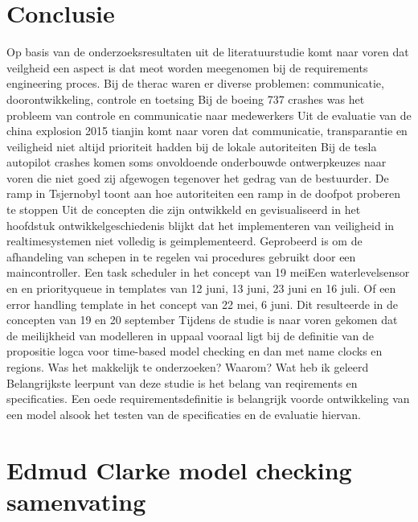 \documentclass{article}
\begin{document}
	\section{Conclusie}
	
	
	
	Op basis van de onderzoeksresultaten uit de literatuurstudie komt naar voren dat veilgheid een aspect is dat meot worden meegenomen bij de requirements engineering proces.
	Bij de therac waren er diverse problemen: communicatie, doorontwikkeling, controle en toetsing
	Bij de boeing 737 crashes was het probleem van controle en communicatie naar medewerkers
	Uit de evaluatie van de china explosion 2015 tianjin komt naar voren dat communicatie, transparantie en veiligheid niet altijd prioriteit hadden bij de lokale autoriteiten
	Bij de tesla autopilot crashes komen soms onvoldoende onderbouwde ontwerpkeuzes naar voren die niet goed zij  afgewogen tegenover het gedrag van de bestuurder.
	De ramp in Tsjernobyl toont aan hoe autoriteiten een ramp in de doofpot proberen te stoppen
	Uit de concepten die zijn ontwikkeld en gevisualiseerd in  het hoofdstuk ontwikkelgeschiedenis blijkt dat het implementeren van veiligheid in  realtimesystemen niet volledig is geimplementeerd. Geprobeerd is om de afhandeling van schepen  in te regelen vai procedures gebruikt door een maincontroller. Een task scheduler in het concept van 19 meiEen waterlevelsensor en en priorityqueue in templates van 12 juni, 13 juni, 23 juni en 16 juli. Of een error handling template in het concept van 22 mei, 6 juni.
	Dit resulteerde in de concepten van 19 en 20 september
	Tijdens de studie is naar voren gekomen dat de meilijkheid van modelleren in uppaal vooraal ligt bij de definitie van de propositie logca voor time-based model checking en dan met name clocks en regions.
	Was het makkelijk te onderzoeken? Waarom?
	Wat heb ik geleerd
	Belangrijkste leerpunt van deze studie is het belang van reqirements en specificaties. Een oede requirementsdefinitie is belangrijk voorde ontwikkeling van een model alsook het testen van de specificaties en de evaluatie hiervan.
	
	
	\newpage
	
	
	\newpage
	
	
	
	
	\appendix
	\newpage
	\section{Edmud Clarke model checking samenvating}
	
	
	
\end{document}
